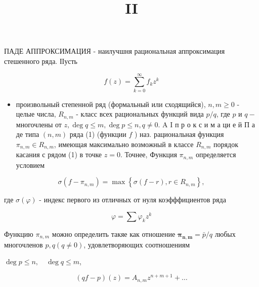 \documentclass[10pt]{article}
\title{II }
\author{}
\date{}
\begin{document}
\maketitle

ПАДЕ АППРОКСИМАЦИЯ - наилучшня рациональная аппроксимация стешенного ряда. ІІусть



\[

f(z)=\sum_{k=0}^{\infty} f_{k} z^{k}

\]



\begin{itemize}

  \item произвольный степенной ряд (формальный или сходящийся), $n, m \geqslant 0$ - целые числа, $R_{n, m}$ - класс всех рациональных функций вида $p / q$, где $p$ и $q-$ многочлены от $z, \operatorname{deg} q \leqslant m, \operatorname{deg} p \leqslant n, q \neq 0$. A I п р о к с и м а ци е й П а де типа $(n, m)$ ряда (1) (функции $f$ ) наз. рациональная функция $\pi_{n, m} \in R_{n, m}$, имеющая максимально возможный в классе $R_{n, m}$ порядок касания с рядом (1) в точке $z=0$. Точнее, Функция $\pi_{n, m}$ определяется условием

\end{itemize}



\[

\sigma\left(f-\pi_{n, m}\right)=\max \left\{\sigma(f-r), r \in R_{n, m}\right\},

\]



где $\sigma(\varphi)$ - индекс первого из отличных от нуля коэфффициентов ряда



\[

\varphi=\sum \varphi_{k} z^{k}

\]



Функцию $\pi_{n, m}$ можно определить такяе как отношение $\boldsymbol{\pi}_{\boldsymbol{n}, \boldsymbol{m}}=\bar{p} / q$ любых многочленов $p, q(q \neq 0)$, удовлетворяющих соотношениям



$\operatorname{deg} p \leqslant n, \quad \operatorname{deg} q \leqslant m$,



\[

(q f-p)(z)=A_{n, m} z^{n+m+1}+\ldots

\]
\end{document}
